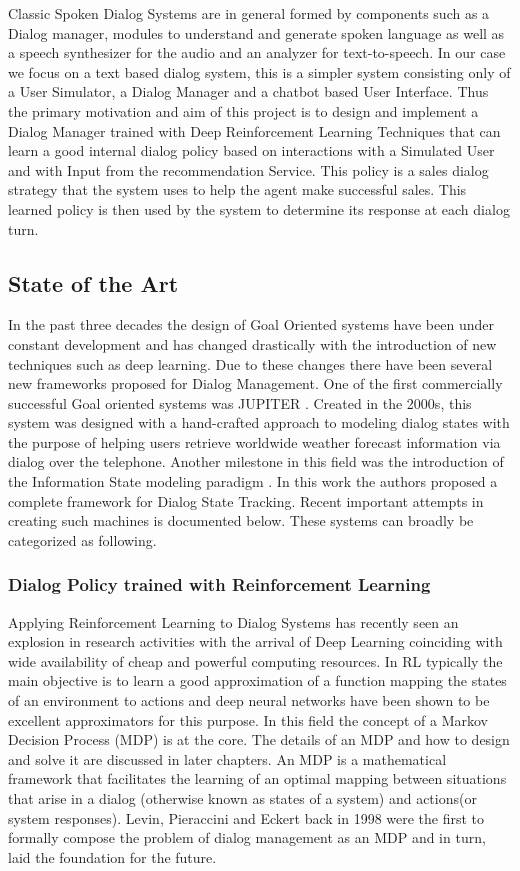 \documentclass[14pt]{extarticle}
\numberwithin{equation}{section}
\begin{document}
	Classic Spoken Dialog Systems are in general formed by components such as a Dialog manager, modules to understand and generate spoken language as well as a speech synthesizer for the audio and an analyzer for text-to-speech. In our case we focus on a text based dialog system, this is a simpler system consisting only of a User Simulator, a Dialog Manager and a chatbot based User Interface. Thus the primary motivation and aim of this project is to design and implement a Dialog Manager trained with Deep Reinforcement Learning Techniques that can learn a good internal dialog policy based on interactions with a Simulated User and with Input from the recommendation Service. This policy is a sales dialog strategy that the system uses to help the agent make successful sales. This learned policy is then used by the system to determine its response at each dialog turn.
	\subsection{State of the Art}
	In the past three decades the design of Goal Oriented systems have been under constant development and has changed drastically with the introduction of new techniques such as deep learning. Due to these changes there have been several new frameworks proposed for Dialog Management. One of the first commercially successful Goal oriented systems was JUPITER \cite{zue_jupiter}. Created in the 2000s, this system was designed with a hand-crafted approach to modeling dialog states with the purpose of helping users retrieve worldwide weather forecast information via dialog over the telephone. Another milestone in this field was the introduction of the Information State modeling paradigm \cite{Larsson:2000:ISD:973935.973943}. In this work the authors proposed a complete framework for Dialog State Tracking.
	Recent important attempts in creating such machines is documented below. These systems can broadly be categorized as following.
	\subsubsection{Dialog Policy trained with Reinforcement Learning}
	Applying Reinforcement Learning to Dialog Systems has recently seen an explosion in research activities with the arrival of Deep Learning coinciding with wide availability of cheap and powerful computing resources. In RL typically the main objective is to learn a good approximation of a function mapping the states of an environment to actions and deep neural networks have been shown to be excellent approximators for this purpose. In this field the concept of a Markov Decision Process (MDP) is at the core. The details of an MDP and how to design and solve it are discussed in later chapters. An MDP is a mathematical framework that facilitates the learning of an optimal mapping between situations that arise in a dialog (otherwise known as states of a system) and actions(or system responses)\cite{mdp-bellmann}. Levin, Pieraccini and Eckert back in 1998 were the first to formally compose the problem of dialog management as an MDP \cite{mdp-pieraccini} and in turn, laid the foundation for the future.
	
\end{document}
